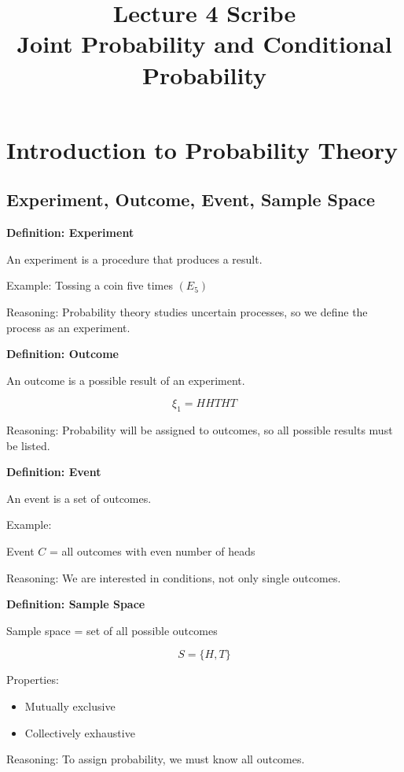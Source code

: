 \documentclass[12pt]{article}
\title{Lecture 4 Scribe \\ Joint Probability and Conditional Probability}
\author{}
\date{}
\begin{document}
\maketitle

\section{Introduction to Probability Theory}

\subsection{Experiment, Outcome, Event, Sample Space}

\textbf{Definition: Experiment}

An experiment is a procedure that produces a result.

Example: Tossing a coin five times $(E_5)$

Reasoning: Probability theory studies uncertain processes, so we define the process as an experiment.

\bigskip

\textbf{Definition: Outcome}

An outcome is a possible result of an experiment.

\[
\xi_1 = HHTHT
\]

Reasoning: Probability will be assigned to outcomes, so all possible results must be listed.

\bigskip

\textbf{Definition: Event}

An event is a set of outcomes.

Example:

Event $C$ = all outcomes with even number of heads

Reasoning: We are interested in conditions, not only single outcomes.

\bigskip

\textbf{Definition: Sample Space}

Sample space = set of all possible outcomes

\[
S = \{H, T\}
\]

Properties:

\begin{itemize}
\item Mutually exclusive
\item Collectively exhaustive
\end{itemize}

Reasoning: To assign probability, we must know all outcomes.
\end{document}
